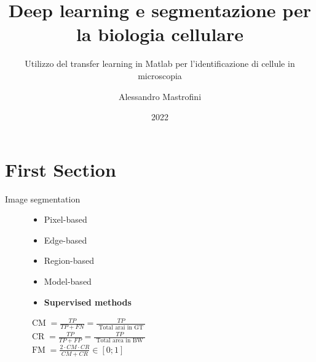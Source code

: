 \documentclass[aspectratio=169,xcolor=dvipsnames]{beamer}
\title[short title]{Deep learning e segmentazione per la biologia cellulare} %
\subtitle{Utilizzo del transfer learning in Matlab per l'identificazione di cellule in microscopia}
\author[Pin-Yen] {Alessandro Mastrofini}
\institute[NTU] %
{
Elaborazione di Immagini \\
Università degli Studi di Roma Tor Vergata%
}
\date{2022} %
\begin{document}
\begin{frame}
    \titlepage
\end{frame}

\section{First Section}

\begin{frame}{Image segmentation}
	\begin{figure}
	\centering
\begin{minipage}{0.5\linewidth}
\begin{itemize}
	\item Pixel-based
	\item Edge-based
	\item Region-based
	\item Model-based
	\item \textbf{Supervised methods}
\end{itemize}
\vspace{0.1\linewidth}

\small{$\operatorname{CM}=\frac{T P}{T P+F N}=\frac{T P}{\text { Total arai in GT }}$}\\


\small{$
\operatorname{CR}=\frac{T P}{T P+F P}=\frac{T P}{\text { Total area in BW }}$}\\


\small{$
\operatorname{FM}=\frac{2 \cdot CM \cdot C R}{C M+C R} \in[0 ; 1]
$}

\end{minipage}
\begin{minipage}{0.35\linewidth}
\tiny{\def\svgwidth{\linewidth}
 }
\end{minipage}
\end{figure}
\end{frame}
\end{document}
